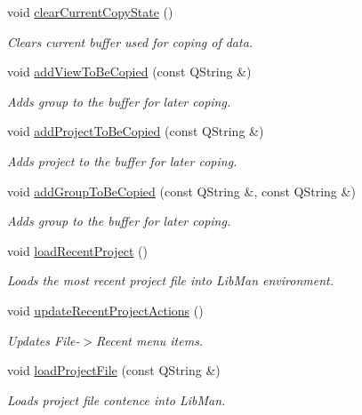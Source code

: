 \begin{DoxyCompactItemize}
void \hyperlink{classMainWindow_af2fb86d1f28ac5f40c0cfdc40280b08c}{clear\-Current\-Copy\-State} ()
\begin{DoxyCompactList}\small\item\em Clears current buffer used for coping of data. \end{DoxyCompactList}\item 
void \hyperlink{classMainWindow_a5fc888265a0d9c20a6a5fc4828d3b434}{add\-View\-To\-Be\-Copied} (const Q\-String \&)
\begin{DoxyCompactList}\small\item\em Adds group to the buffer for later coping. \end{DoxyCompactList}\item 
void \hyperlink{classMainWindow_a34d6f30b3ac4af259e64a141200f49da}{add\-Project\-To\-Be\-Copied} (const Q\-String \&)
\begin{DoxyCompactList}\small\item\em Adds project to the buffer for later coping. \end{DoxyCompactList}\item 
void \hyperlink{classMainWindow_af85f171e5a269a87031d100455b78b82}{add\-Group\-To\-Be\-Copied} (const Q\-String \&, const Q\-String \&)
\begin{DoxyCompactList}\small\item\em Adds group to the buffer for later coping. \end{DoxyCompactList}\item 
void \hyperlink{classMainWindow_aad64417dd963cf8816a47097df343297}{load\-Recent\-Project} ()
\begin{DoxyCompactList}\small\item\em Loads the most recent project file into Lib\-Man environment. \end{DoxyCompactList}\item 
void \hyperlink{classMainWindow_ad8c228fb00728ea101b53f2778c96a1a}{update\-Recent\-Project\-Actions} ()
\begin{DoxyCompactList}\small\item\em Updates File-\/$>$Recent menu items. \end{DoxyCompactList}\item 
void \hyperlink{classMainWindow_a0b51bc62adc32da1189785375d888595}{load\-Project\-File} (const Q\-String \&)
\begin{DoxyCompactList}\small\item\em Loads project file contence into Lib\-Man. \end{DoxyCompactList}\item 

\end{DoxyCompactItemize}
